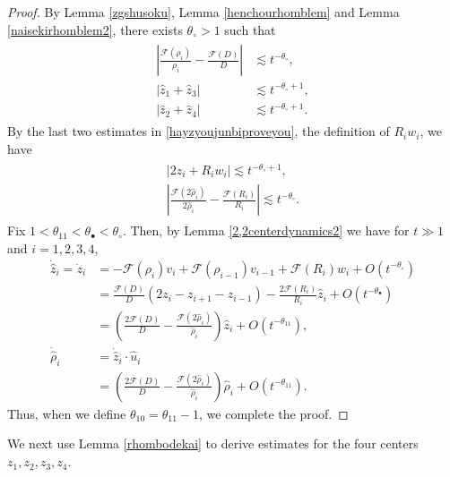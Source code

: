 \documentclass[10pt,a4paper]{amsart}
\numberwithin{equation}{section}
\begin{document}
\begin{proof}
By Lemma \ref{zgshusoku}, Lemma \ref{henchourhomblem} and Lemma \ref{naisekirhomblem2}, there exists $\theta_{\circ}>1$ such that
\begin{align}\label{hayzyoujunbiproveyou}
\begin{aligned}
\left|\frac{\mathcal{F}(\rho_i)}{\rho_i}-\frac{\mathcal{F}(D)}{D}\right|&\lesssim t^{-\theta_{\circ}},
\\
\left|\hat{z}_1+\hat{z}_3\right|&\lesssim t^{-\theta_{\circ}+1},
\\
\left|\hat{z}_2+\hat{z}_4\right|&\lesssim t^{-\theta_{\circ}+1}.
\end{aligned}
\end{align}
By the last two estimates in \eqref{hayzyoujunbiproveyou}, the definition of $R_iw_i$, we have
\begin{align}\label{a}
\begin{aligned}
\left|2\hat{z}_i+R_iw_i\right|\lesssim t^{-\theta_{\circ}+1},
\\
\left|\frac{\mathcal{F}(2\hat{\rho}_i)}{2\hat{\rho}_i}-\frac{\mathcal{F}(R_i)}{R_i}\right|\lesssim t^{-\theta_{\circ}}.
\end{aligned}
\end{align}
Fix $1<\theta_{11}<\theta_{\bullet}<\theta_{\circ}$. Then, by Lemma \ref{2,2centerdynamics2} we have for $t\gg1$ and $i=1,2,3,4$,
\begin{align*}
\dot{\hat{z}}_i=\dot{z}_i&=-\mathcal{F}(\rho_i)v_i+\mathcal{F}(\rho_{i-1})v_{i-1}+\mathcal{F}(R_i)w_i+O\left(t^{-\theta_{\circ}}\right)
\\
&=\frac{\mathcal{F}(D)}{D}\left(2z_i-z_{i+1}-z_{i-1}\right)-\frac{2\mathcal{F}(R_i)}{R_i}\hat{z}_i+O\left(t^{-\theta_{\bullet}}\right)
\\
&=\left(\frac{2\mathcal{F}(D)}{D}-\frac{\mathcal{F}(2\hat{\rho}_i)}{\hat{\rho}_i}\right)\hat{z}_i+O\left(t^{-\theta_{11}}\right),
\\
\dot{\hat{\rho}}_i&=\dot{\hat{z}}_i\cdot \hat{u}_i
\\
&=\left(\frac{2\mathcal{F}(D)}{D}-\frac{\mathcal{F}(2\hat{\rho}_i)}{\hat{\rho}_i}\right)\hat{\rho}_i+O\left(t^{-\theta_{11}}\right).
\end{align*}
Thus, when we define $\theta_{10}=\theta_{11}-1$, we complete the proof.
\end{proof}


We next use Lemma \ref{rhombodekai} to derive estimates for the four centers $z_1,z_2,z_3,z_4$.
\end{document}
